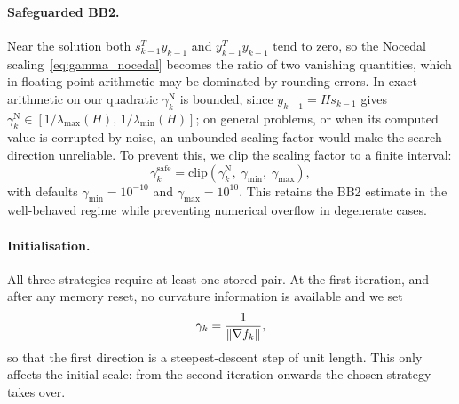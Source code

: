 

\paragraph{Safeguarded BB2.}
Near the solution both $s_{k-1}^T y_{k-1}$ and $y_{k-1}^T y_{k-1}$ tend to
zero, so the Nocedal scaling~\eqref{eq:gamma_nocedal} becomes the ratio of two
vanishing quantities, which in floating-point arithmetic may be dominated by
rounding errors. In exact arithmetic on our quadratic $\gamma_k^{\mathrm{N}}$
is bounded, since $y_{k-1} = H s_{k-1}$ gives
$\gamma_k^{\mathrm{N}} \in [1/\lambda_{\max}(H),\, 1/\lambda_{\min}(H)]$;
on general problems, or when its computed value is corrupted by noise, an
unbounded scaling factor would make the search direction unreliable. To
prevent this, we clip the scaling factor to a finite interval:
\begin{equation}
\label{eq:gamma_safe}
    \gamma_k^{\mathrm{safe}} = \mathrm{clip}\!\left(
        \gamma_k^{\mathrm{N}},\; \gamma_{\min},\; \gamma_{\max}
    \right),
\end{equation}
with defaults $\gamma_{\min} = 10^{-10}$ and $\gamma_{\max} = 10^{10}$.
This retains the BB2 estimate in the well-behaved regime while preventing 
numerical overflow in degenerate cases.

\paragraph{Initialisation.}
All three strategies require at least one stored pair. At the first iteration,
and after any memory reset, no curvature information is available and we set
\begin{equation}
\label{eq:gamma_init}
    \gamma_k = \frac{1}{\left\|\nabla f_k\right\|},
\end{equation}
so that the first direction is a steepest-descent step of unit length. This
only affects the initial scale: from the second iteration onwards the chosen
strategy takes over.

